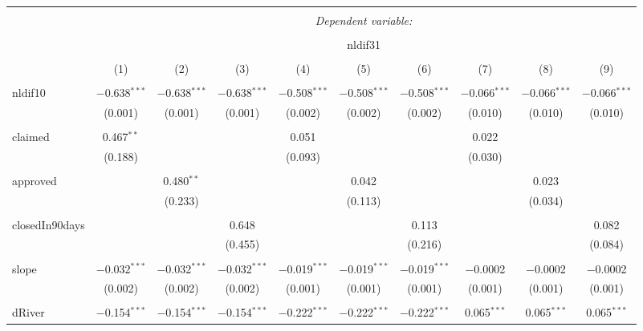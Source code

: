 \documentclass{article}
\begin{document}

\begin{table}[!htbp] \centering 
  \caption{} 
  \label{} 
\begin{tabular}{@{\extracolsep{5pt}}lccccccccc} 
\\[-1.8ex]\hline 
\hline \\[-1.8ex] 
 & \multicolumn{9}{c}{\textit{Dependent variable:}} \\ 
\cline{2-10} 
\\[-1.8ex] & \multicolumn{9}{c}{nldif31} \\ 
\\[-1.8ex] & (1) & (2) & (3) & (4) & (5) & (6) & (7) & (8) & (9)\\ 
\hline \\[-1.8ex] 
 nldif10 & $-$0.638$^{***}$ & $-$0.638$^{***}$ & $-$0.638$^{***}$ & $-$0.508$^{***}$ & $-$0.508$^{***}$ & $-$0.508$^{***}$ & $-$0.066$^{***}$ & $-$0.066$^{***}$ & $-$0.066$^{***}$ \\ 
  & (0.001) & (0.001) & (0.001) & (0.002) & (0.002) & (0.002) & (0.010) & (0.010) & (0.010) \\ 
  & & & & & & & & & \\ 
 claimed & 0.467$^{**}$ &  &  & 0.051 &  &  & 0.022 &  &  \\ 
  & (0.188) &  &  & (0.093) &  &  & (0.030) &  &  \\ 
  & & & & & & & & & \\ 
 approved &  & 0.480$^{**}$ &  &  & 0.042 &  &  & 0.023 &  \\ 
  &  & (0.233) &  &  & (0.113) &  &  & (0.034) &  \\ 
  & & & & & & & & & \\ 
 closedIn90days &  &  & 0.648 &  &  & 0.113 &  &  & 0.082 \\ 
  &  &  & (0.455) &  &  & (0.216) &  &  & (0.084) \\ 
  & & & & & & & & & \\ 
 slope & $-$0.032$^{***}$ & $-$0.032$^{***}$ & $-$0.032$^{***}$ & $-$0.019$^{***}$ & $-$0.019$^{***}$ & $-$0.019$^{***}$ & $-$0.0002 & $-$0.0002 & $-$0.0002 \\ 
  & (0.002) & (0.002) & (0.002) & (0.001) & (0.001) & (0.001) & (0.001) & (0.001) & (0.001) \\ 
  & & & & & & & & & \\ 
 dRiver & $-$0.154$^{***}$ & $-$0.154$^{***}$ & $-$0.154$^{***}$ & $-$0.222$^{***}$ & $-$0.222$^{***}$ & $-$0.222$^{***}$ & 0.065$^{***}$ & 0.065$^{***}$ & 0.065$^{***}$ \\ 

\end{tabular}
\end{table}
\end{document}
